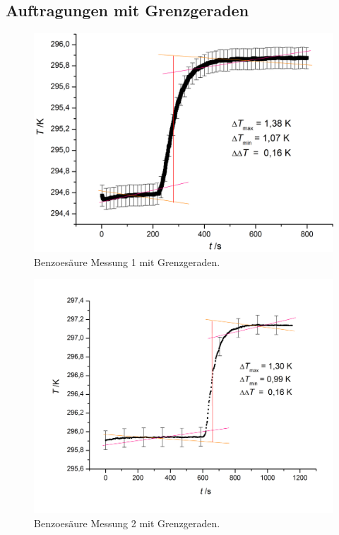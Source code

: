 \documentclass[12pt,a4paper,titlepage,headinclude,bibtotoc]{scrartcl}
\begin{document}
\subsection{Auftragungen mit Grenzgeraden}
\begin{figure} [h!]
\begin{center}
\includegraphics[scale=0.45]{Benz1Fehler.png} \end{center}
\caption{Benzoesäure Messung 1 mit Grenzgeraden.}
\end{figure}

\begin{figure} [h!]
\begin{center}
\includegraphics[scale=0.45]{Benz2Fehler.png} \end{center}
\caption{Benzoesäure Messung 2 mit Grenzgeraden.}
\end{figure}
\end{document}
